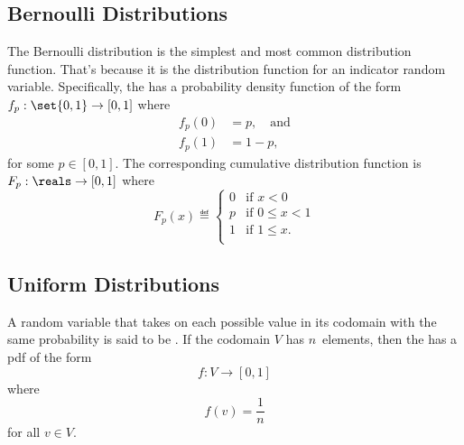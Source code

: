 \subsection{Bernoulli Distributions}\label{sec:bernoulli_dist}

The Bernoulli distribution is the simplest and most common
distribution function.  That's because it is the distribution function
for an indicator random variable.  Specifically, the  has a probability density function of the form $f_p:
\set{0, 1} \to [0, 1]$ where
\begin{align*}
    f_p(0) &= p, \quad\text{and} \\
    f_p(1) &= 1 - p,
\end{align*}
for some $p \in [0, 1]$.  The corresponding cumulative distribution
function is $F_p: \reals \to [0, 1]$ where
\begin{equation*}
F_{p}(x) \eqdef
    \begin{cases}
        0 & \text{if $x < 0$} \\
        p & \text{if $0 \le x < 1$} \\
        1 & \text{if $1 \le x$}. \\
    \end{cases}
\end{equation*}

\subsection{Uniform Distributions}\label{sec:uniform_dist}

A random variable that takes on each possible value in its codomain
with the same probability is said to be .  If the
codomain $V$ has $n$~elements, then the  has a pdf of the form
\begin{equation*}
    f: V \to [0,1]
\end{equation*}
where
\[
    f(v) = \frac{1}{n}
\]
for all $v \in V$.  

\iffalse
If $V = \set{1,2,\dots,n}$, the cumulative distribution function would be
$F: \reals \to [0, 1]$ where
\[
F(x) \eqdef
    \begin{cases}
        0 & \text{if $x < 1$} \\
        k/n & \text{if $k \le x < k + 1$ for $1 \le k < n$} \\
        1 & \text{if $n \le x$}.
    \end{cases}
\]
\fi

